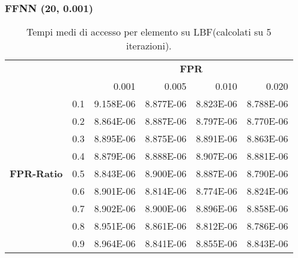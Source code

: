 \documentclass[4apaper,11pt]{report}
\begin{document}
    \subsubsection{FFNN (20, 0.001) }
    \begin{table}[H]
        \centering
        \begin{tabular}{llrrrr}
        \toprule
        {} & & \multicolumn{4}{c}{\textbf{FPR}}\\
        {} & &    0.001 &     0.005 &     0.010 &     0.020 \\
        \midrule
        \multirow{9}{*}{\textbf{FPR-Ratio}} & 0.1& 9.158E-06 & 8.877E-06 & 8.823E-06 & 8.788E-06 \\
        &0.2& 8.864E-06 & 8.887E-06 & 8.797E-06 & 8.770E-06 \\
        &0.3& 8.895E-06 & 8.875E-06 & 8.891E-06 & 8.863E-06 \\
        &0.4& 8.879E-06 & 8.888E-06 & 8.907E-06 & 8.881E-06 \\
        &0.5& 8.843E-06 & 8.900E-06 & 8.887E-06 & 8.790E-06 \\
        &0.6& 8.901E-06 & 8.814E-06 & 8.774E-06 & 8.824E-06 \\
        &0.7& 8.902E-06 & 8.900E-06 & 8.896E-06 & 8.858E-06 \\
        &0.8& 8.951E-06 & 8.861E-06 & 8.812E-06 & 8.786E-06 \\
        &0.9& 8.964E-06 & 8.841E-06 & 8.855E-06 & 8.843E-06 \\
        \bottomrule
        \end{tabular}
        \caption{Tempi medi di accesso per elemento su LBF(calcolati su 5 iterazioni).}
    \end{table}
\end{document}
